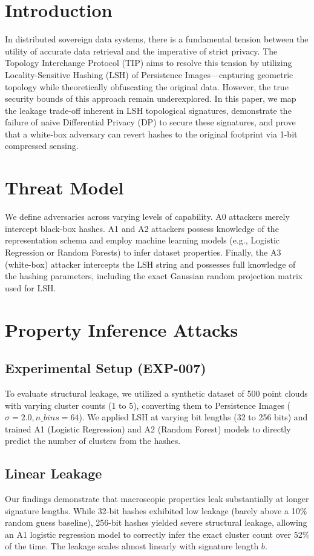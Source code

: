 \documentclass[10pt, conference]{IEEEtran}
\begin{document}
\section{Introduction}
In distributed sovereign data systems, there is a fundamental tension between the utility of accurate data retrieval and the imperative of strict privacy. The Topology Interchange Protocol (TIP) aims to resolve this tension by utilizing Locality-Sensitive Hashing (LSH) of Persistence Images—capturing geometric topology while theoretically obfuscating the original data. However, the true security bounds of this approach remain underexplored. In this paper, we map the leakage trade-off inherent in LSH topological signatures, demonstrate the failure of naive Differential Privacy (DP) to secure these signatures, and prove that a white-box adversary can revert hashes to the original footprint via 1-bit compressed sensing.

\section{Threat Model}
We define adversaries across varying levels of capability. A0 attackers merely intercept black-box hashes. A1 and A2 attackers possess knowledge of the representation schema and employ machine learning models (e.g., Logistic Regression or Random Forests) to infer dataset properties. Finally, the A3 (white-box) attacker intercepts the LSH string and possesses full knowledge of the hashing parameters, including the exact Gaussian random projection matrix used for LSH.

\section{Property Inference Attacks}
\subsection{Experimental Setup (EXP-007)}
To evaluate structural leakage, we utilized a synthetic dataset of 500 point clouds with varying cluster counts (1 to 5), converting them to Persistence Images ($\sigma=2.0, n\_bins=64$). We applied LSH at varying bit lengths (32 to 256 bits) and trained A1 (Logistic Regression) and A2 (Random Forest) models to directly predict the number of clusters from the hashes.
\subsection{Linear Leakage}
Our findings demonstrate that macroscopic properties leak substantially at longer signature lengths. While 32-bit hashes exhibited low leakage (barely above a 10\% random guess baseline), 256-bit hashes yielded severe structural leakage, allowing an A1 logistic regression model to correctly infer the exact cluster count over 52\% of the time. The leakage scales almost linearly with signature length $b$.
\end{document}
